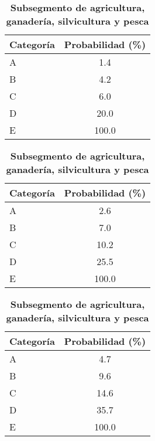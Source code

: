 \begin{table}[H]
\begin{subtable}[t]{0.32\textwidth}
\centering
\begin{tabular}{@{}lc@{}}
\toprule
\textbf{Categoría} & \textbf{Probabilidad (\%)} \\
\midrule
A & 1.4 \\
B & 4.2 \\
C & 6.0 \\
D & 20.0 \\
E & 100.0 \\
\bottomrule
\end{tabular}
\caption{\textbf{Subsegmento de suministro de electricidad, gas y agua}}
\end{subtable}
\hfill
\begin{subtable}[t]{0.32\textwidth}
\centering
\begin{tabular}{@{}lc@{}}
\toprule
\textbf{Categoría} & \textbf{Probabilidad (\%)} \\
\midrule
A & 2.6 \\
B & 7.0 \\
C & 10.2 \\
D & 25.5 \\
E & 100.0 \\
\bottomrule
\end{tabular}
\caption{\textbf{Subsegmento de establecimientos financieros}}
\end{subtable}
\hfill
\begin{subtable}[t]{0.32\textwidth}
\centering
\begin{tabular}{@{}lc@{}}
\toprule
\textbf{Categoría} & \textbf{Probabilidad (\%)} \\
\midrule
A & 4.7 \\
B & 9.6 \\
C & 14.6 \\
D & 35.7 \\
E & 100.0 \\
\bottomrule
\end{tabular}
\caption{\textbf{Subsegmento de agricultura, ganadería, silvicultura y pesca}}
\end{subtable}



\end{table}

